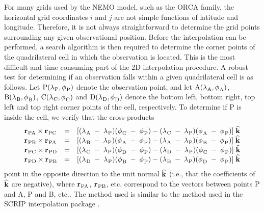 For many grids used by the NEMO model, such as the ORCA family, 
the horizontal grid coordinates $i$ and $j$ are not simple functions 
of latitude and longitude. Therefore, it is not always straightforward 
to determine the grid points surrounding any given observational position.
Before the interpolation can be performed, a search 
algorithm is then required to determine the corner points of 
the quadrilateral cell in which the observation is located.
This is the most difficult and time consuming part of the 
2D interpolation procedure. 
A robust test for determining if an observation falls
within a given quadrilateral cell is as follows. Let 
${\rm P}({\lambda_{}}_{\rm P} ,{\phi_{}}_{\rm P} )$ denote the observation point,
and let ${\rm A}({\lambda_{}}_{\rm A} ,{\phi_{}}_{\rm A} )$,
${\rm B}({\lambda_{}}_{\rm B} ,{\phi_{}}_{\rm B} )$,
${\rm C}({\lambda_{}}_{\rm C} ,{\phi_{}}_{\rm C} )$ 
and 
${\rm D}({\lambda_{}}_{\rm D} ,{\phi_{}}_{\rm D} )$ denote
the bottom left, bottom right, top left and top right
corner points of the cell, respectively. 
To determine if P is inside 
the cell, we verify that the cross-products 
\begin{eqnarray}
\begin{array}{lllll}
{{\bf r}_{}}_{\rm PA} \times {{\bf r}_{}}_{\rm PC}
& = & [({\lambda_{}}_{\rm A}\; -\; {\lambda_{}}_{\rm P} )
      ({\phi_{}}_{\rm C}   \; -\; {\phi_{}}_{\rm P} )
    - ({\lambda_{}}_{\rm C}\; -\; {\lambda_{}}_{\rm P} )
      ({\phi_{}}_{\rm A}   \; -\; {\phi_{}}_{\rm P} )] \; \widehat{\bf k} \\
{{\bf r}_{}}_{\rm PB} \times {{\bf r}_{}}_{\rm PA}
& = & [({\lambda_{}}_{\rm B}\; -\; {\lambda_{}}_{\rm P} )
      ({\phi_{}}_{\rm A}   \; -\; {\phi_{}}_{\rm P} )
    - ({\lambda_{}}_{\rm A}\; -\; {\lambda_{}}_{\rm P} )
      ({\phi_{}}_{\rm B}   \; -\; {\phi_{}}_{\rm P} )] \; \widehat{\bf k} \\
{{\bf r}_{}}_{\rm PC} \times {{\bf r}_{}}_{\rm PD}
& = & [({\lambda_{}}_{\rm C}\; -\; {\lambda_{}}_{\rm P} )
      ({\phi_{}}_{\rm D}   \; -\; {\phi_{}}_{\rm P} )
    - ({\lambda_{}}_{\rm D}\; -\; {\lambda_{}}_{\rm P} )
      ({\phi_{}}_{\rm C}   \; -\; {\phi_{}}_{\rm P} )] \; \widehat{\bf k} \\
{{\bf r}_{}}_{\rm PD} \times {{\bf r}_{}}_{\rm PB}
& = & [({\lambda_{}}_{\rm D}\; -\; {\lambda_{}}_{\rm P} )
      ({\phi_{}}_{\rm B}   \; -\; {\phi_{}}_{\rm P} )
    - ({\lambda_{}}_{\rm B}\; -\; {\lambda_{}}_{\rm P} )
      ({\phi_{}}_{\rm D}  \;  - \; {\phi_{}}_{\rm P} )] \; \widehat{\bf k} \\
\end{array}
\label{eq:cross}
\end{eqnarray}
point in the opposite direction to the unit normal 
$\widehat{\bf k}$ (i.e., that the coefficients of 
$\widehat{\bf k}$ are negative),
where ${{\bf r}_{}}_{\rm PA}$, ${{\bf r}_{}}_{\rm PB}$, 
etc. correspond to the vectors between points P and A, 
P and B, etc.. The method used is
similar to the method used in
the SCRIP interpolation package \citep{Jones_1998}.

